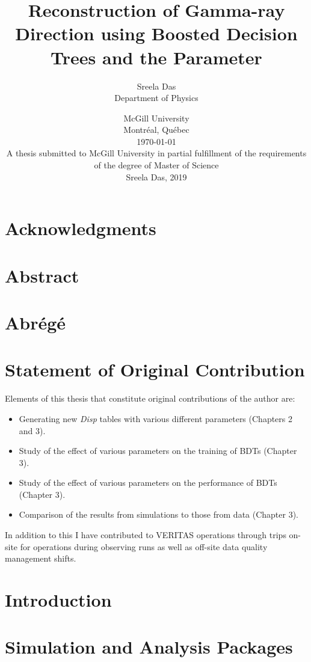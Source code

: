 \documentclass[openany, oneside, 12pt]{book}
\title{\Huge Reconstruction of Gamma-ray Direction using Boosted Decision Trees and the \disp Parameter \vspace{14pt}}
\author{\Large Sreela Das \\ \large Department of Physics \vspace{33pt}}
\date{\large McGill University \\ \large Montr\'eal, Qu\'ebec \\ \large \today \vspace{33pt}\\
  A thesis submitted to McGill University in partial fulfillment of the requirements of the degree of Master of Science\\ \vspace{30pt}\textcopyright \hspace{5pt}Sreela Das, 2019}
\newcommand{\disp}{\textit{Disp }}
\begin{document}
\clearpage
\frontmatter
\renewcommand{\chaptermark}[1]{\markboth{\MakeUppercase{\chaptername\ \thechapter.\ #1}}{}}
\maketitle
\clearpage
{}
\raggedright
\chapter{Acknowledgments}

\clearpage
\chapter{Abstract}

\clearpage
\chapter{Abr\'eg\'e}

\chapter{Statement of Original Contribution}
Elements of this thesis that constitute original contributions of the author are:
\begin{itemize}
\item Generating new \disp tables with various different parameters (Chapters 2 and 3).
\item Study of the effect of various parameters on the training of BDTs (Chapter 3).
\item Study of the effect of various parameters on the performance of BDTs (Chapter 3).
\item Comparison of the results from simulations to those from data (Chapter 3).
\end{itemize}
In addition to this I have contributed to VERITAS operations through trips on-site for operations during observing runs as well as off-site data quality management shifts. 

\clearpage
\tableofcontents
\listoffigures
\listoftables
\mainmatter
\raggedbottom

\setlength\parindent{24pt}
\setlength\parskip{10pt}
\pagestyle{plain}

\chapter{Introduction}


\chapter{Simulation and Analysis Packages}

\end{document}
